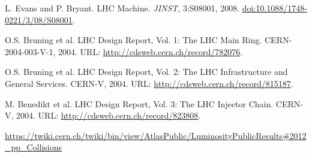 \begin{thebibliography}{99}
\setlength{\itemsep}{0.3in}

L. Evans and P. Bryant. LHC Machine. \textit{JINST}, 3:S08001, 2008. \href{http://iopscience.iop.org/1748-0221/3/08/S08001/}{doi:10.1088/1748-0221/3/08/S08001}.


O.S. Bruning et al. LHC Design Report, Vol. 1: The LHC Main Ring. CERN-2004-003-V-1, 2004. URL: \href{http://cdsweb.cern.ch/record/782076}{http://cdsweb.cern.ch/record/782076}.

O.S. Bruning et al. LHC Design Report, Vol. 2: The LHC Infrastructure and General Services. CERN\--V, 2004. URL: \url{http://cdsweb.cern.ch/record/815187}.

M. Benedikt et al. LHC Design Report, Vol. 3: The LHC Injector Chain. CERN\--V, 2004. URL: \href{http://cdsweb.cern.ch/record/823808}{http://cdsweb.cern.ch/record/823808}.


\url{https://twiki.cern.ch/twiki/bin/view/AtlasPublic/LuminosityPublicResults#2012_pp_Collisions}

\end{thebibliography}
